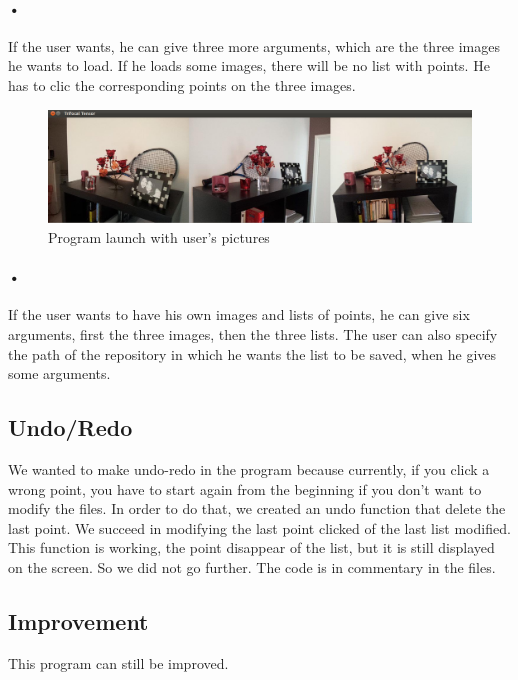 \documentclass{report}
\begin{document}
\paragraph{•}
If the user wants, he can give three more arguments, which are the three images he wants to load. If he loads some images, there will be no list with points. He has to clic the corresponding points on the three images. 

\newpage
\begin{center}
\begin{figure}[ht]
    \includegraphics[scale=0.334]{images.png}
    \caption{Program launch with user's pictures}
    \label{Picture 2}
\end{figure} 
\end{center}

\paragraph{•}
If the user wants to have his own images and lists of points, he can give six arguments, first the three images, then the three lists. 
The user can also specify the path of the repository in which he wants the list to be saved, when he gives some arguments. 

\textcolor{subtitle}{\subsection{Undo/Redo}}
We wanted to make undo-redo in the program because currently, if you click a wrong point, you have to start again from the beginning if you don't want to modify the files. In order to do that, we created an undo function that delete the last point. We succeed in modifying the last point clicked of the last list modified. This function is working, the point disappear of the list, but it is still displayed on the screen. 
So we did not go further. The code is in commentary in the files. 

\textcolor{title}{\section{Improvement}}
This program can still be improved. 
\end{document}
